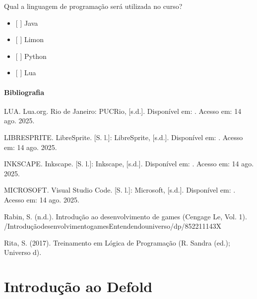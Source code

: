 \documentclass[letterpaper,10pt,brazil]{sphinxmanual}
\begin{document}
 \textendash{} Qual a linguagem de programação será utilizada no curso?
\begin{itemize}
\item {} 
\sphinxAtStartPar
{[} {]} Java

\item {} 
\sphinxAtStartPar
{[} {]} Limon

\item {} 
\sphinxAtStartPar
{[} {]} Python

\item {} 
\sphinxAtStartPar
{[} {]} Lua

\end{itemize}

\newpage
\subsubsection*{Bibliografia}

\sphinxAtStartPar
LUA. Lua.org. Rio de Janeiro: PUC\sphinxhyphen{}Rio, {[}s.d.{]}.
Disponível em: . Acesso em: 14 ago. 2025.

\sphinxAtStartPar
LIBRESPRITE. LibreSprite. {[}S. l.{]}: LibreSprite, {[}s.d.{]}.
Disponível em: . Acesso em: 14 ago. 2025.

\sphinxAtStartPar
INKSCAPE. Inkscape. {[}S. l.{]}: Inkscape, {[}s.d.{]}.
Disponível em: . Acesso em: 14 ago. 2025.

\sphinxAtStartPar
MICROSOFT. Visual Studio Code. {[}S. l.{]}: Microsoft, {[}s.d.{]}.
Disponível em: . Acesso em: 14 ago. 2025.

\sphinxAtStartPar
Rabin, S. (n.d.). Introdução ao desenvolvimento de games (Cengage Le, Vol. 1).
/Introdução\sphinxhyphen{}desenvolvimento\sphinxhyphen{}games\sphinxhyphen{}Entendendo\sphinxhyphen{}universo/dp/852211143X

\sphinxAtStartPar
Rita, S. (2017). Treinamento em Lógica de Programação (R. Sandra (ed.); Universo d).

\sphinxstepscope


\chapter{Introdução ao Defold}
\label{\detokenize{modelo_aula_02:introducao-ao-defold}}\label{\detokenize{modelo_aula_02::doc}}
\end{document}
